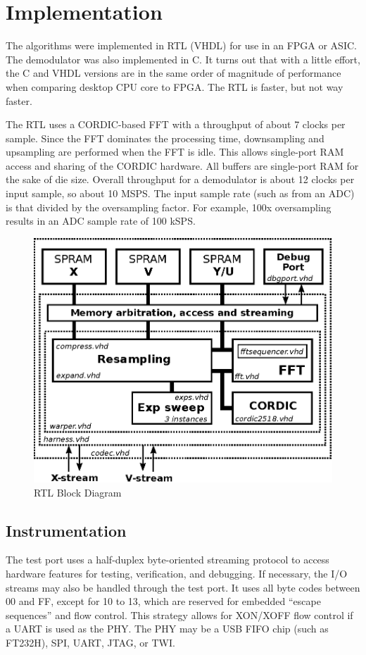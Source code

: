 \section{Implementation}

The algorithms were implemented in RTL (VHDL) for use in an FPGA or ASIC.
The demodulator was also implemented in C. 
It turns out that with a little effort, the C and VHDL versions are in the same
order of magnitude of performance when comparing desktop CPU core to FPGA.
The RTL is faster, but not way faster.

The RTL uses a CORDIC-based FFT with a throughput of about 7 clocks per sample.
Since the FFT dominates the processing time, downsampling and upsampling
are performed when the FFT is idle.
This allows single-port RAM access and sharing of the CORDIC hardware. 
All buffers are single-port RAM for the sake of die size.
Overall throughput for a demodulator is about 12 clocks per input sample,
so about 10 MSPS. The input sample rate (such as from an ADC) is that divided
by the oversampling factor. For example, 100x oversampling results in
an ADC sample rate of 100 kSPS.

\begin{figure}
	\centering
	\includegraphics[width=0.8\linewidth]{../source/rtl_e}
	\caption[Quantum Time to Relative Time Hardware]{RTL Block Diagram}
	\label{fig:rtl}
\end{figure}

\subsection{Instrumentation}

The test port uses a half-duplex byte-oriented streaming protocol to access
hardware features for testing, verification, and debugging.
If necessary, the I/O streams may also be handled through the test port.
It uses all byte codes between 00 and FF, except for 10 to 13,
which are reserved for embedded ``escape sequences'' and flow control.
This strategy allows for XON/XOFF flow control if a UART is used as the PHY.
The PHY may be a USB FIFO chip (such as FT232H), SPI, UART, JTAG, or TWI.

